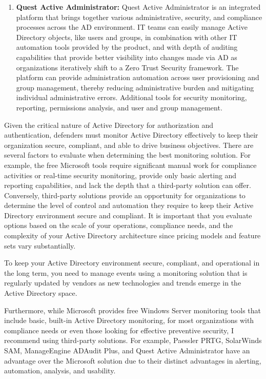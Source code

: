 \begin{enumerate}
    \item \textbf{Quest Active Administrator:} Quest Active Administrator is an integrated platform that brings together various administrative, security, and compliance processes across the AD environment. IT teams can easily manage Active Directory objects, like users and groups, in combination with other IT automation tools provided by the product, and with depth of auditing capabilities that provide better visibility into changes made via AD as organizations iteratively shift to a Zero Trust Security framework. The platform can provide administration automation across user provisioning and group management, thereby reducing administrative burden and mitigating individual administrative errors. Additional tools for security monitoring, reporting, permissions analysis, and user and group management.
\end{enumerate}

Given the critical nature of Active Directory for authorization and authentication, defenders must monitor Active Directory effectively to keep their organization secure, compliant, and able to drive business objectives. There are several factors to evaluate when determining the best monitoring solution. For example, the free Microsoft tools require significant manual work for compliance activities or real-time security monitoring, provide only basic alerting and reporting capabilities, and lack the depth that a third-party solution can offer. Conversely, third-party solutions provide an opportunity for organizations to determine the level of control and automation they require to keep their Active Directory environment secure and compliant. It is important that you evaluate options based on the scale of your operations, compliance needs, and the complexity of your Active Directory architecture since pricing models and feature sets vary substantially.

To keep your Active Directory environment secure, compliant, and operational in the long term, you need to manage events using a monitoring solution that is regularly updated by vendors as new technologies and trends emerge in the Active Directory space.

Furthermore, while Microsoft provides free Windows Server monitoring tools that include basic, built-in Active Directory monitoring, for most organizations with compliance needs or even those looking for effective preventive security, I recommend using third-party solutions. For example, Paessler PRTG, SolarWinds SAM, ManageEngine ADAudit Plus, and Quest Active Administrator have an advantage over the Microsoft solution due to their distinct advantages in alerting, automation, analysis, and usability.
